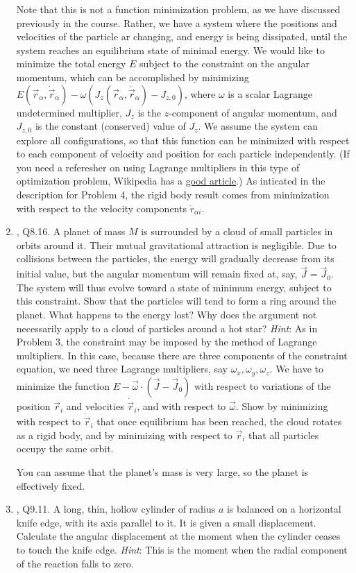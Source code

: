 \documentclass[../psets.tex]{subfiles}
\begin{document}
\begin{enumerate}
    Note that this is not a function minimization problem, as we have discussed previously in the course. Rather, we have a system where the positions and velocities of the particle ar changing, and energy is being dissipated, until the system reaches an equilibrium state of minimal energy. We would like to minimize the total energy $E$ subject to the constraint on the angular momentum, which can be accomplished by minimizing $E(\vec{r}_\alpha,\dot{\vec{r}}_\alpha)-\omega(J_z(\vec{r}_\alpha,\dot{\vec{r}}_\alpha)-J_{z,0})$, where $\omega$ is a scalar Lagrange undetermined multiplier, $J_z$ is the $z$-component of angular momentum, and $J_{z,0}$ is the constant (conserved) value of $J_z$. We assume the system can explore all configurations, so that this function can be minimized with respect to each component of velocity and position for each particle independently. (If you need a referesher on using Lagrange multipliers in this type of optimization problem, Wikipedia has a \href{https://en.wikipedia.org/wiki/Lagrange_multiplier}{good article}.) As inticated in the description for Problem 4, the rigid body result comes from minimization with respect to the velocity components $\dot{r}_{\alpha i}$.
    \item \textcite{bib:KibbleBerkshire}, Q8.16. A planet of mass $M$ is surrounded by a cloud of small particles in orbits around it. Their mutual gravitational attraction is negligible. Due to collisions between the particles, the energy will gradually decrease from its initial value, but the angular momentum will remain fixed at, say, $\vec{J}=\vec{J}_0$. The system will thus evolve toward a state of minimum energy, subject to this constraint. Show that the particles will tend to form a ring around the planet. What happens to the energy lost? Why does the argument not necessarily apply to a cloud of particles around a hot star? \emph{Hint}: As in Problem 3, the constraint may be imposed by the method of Lagrange multipliers. In this case, because there are three components of the constraint equation, we need three Lagrange multipliers, say $\omega_x,\omega_y,\omega_z$. We have to minimize the function $E-\vec{\omega}\cdot(\vec{J}-\vec{J}_0)$ with respect to variations of the position $\vec{r}_i$ and velocities $\dot{\vec{r}}_i$, and with respect to $\vec{\omega}$. Show by minimizing with respect to $\dot{\vec{r}}_i$ that once equilibrium has been reached, the cloud rotates as a rigid body, and by minimizing with respect to $\vec{r}_i$ that all particles occupy the same orbit.\par
    You can assume that the planet's mass is very large, so the planet is effectively fixed.
    \item \textcite{bib:KibbleBerkshire}, Q9.11. A long, thin, hollow cylinder of radius $a$ is balanced on a horizontal knife edge, with its axis parallel to it. It is given a small displacement. Calculate the angular displacement at the moment when the cylinder ceases to touch the knife edge. \emph{Hint}: This is the moment when the radial component of the reaction falls to zero.
\end{enumerate}
\end{document}

